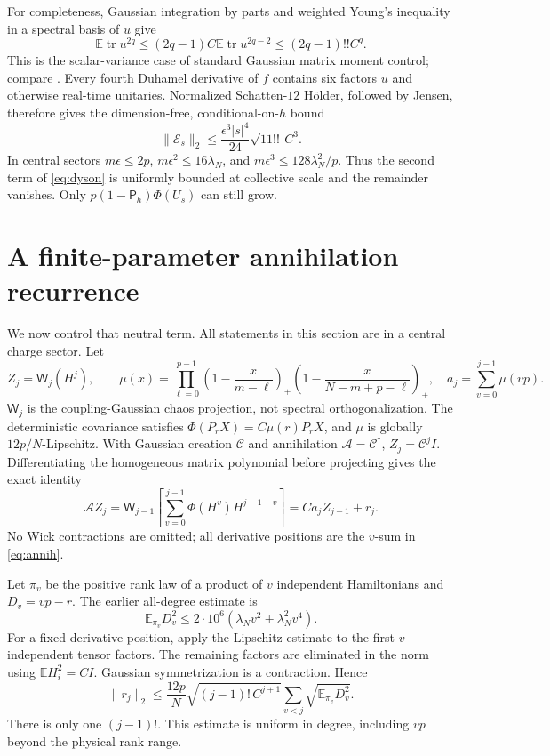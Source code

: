\documentclass[11pt,a4paper]{article}
\newcommand{\EE}{\mathbb E}
\newcommand{\tr}{\operatorname{tr}}
\newcommand{\PP}{\mathsf P_h}
\newcommand{\W}{\mathsf W}
\begin{document}
For completeness, Gaussian integration by parts and weighted Young's
inequality in a spectral basis of $u$ give
\begin{equation}
 \EE\tr u^{2q}\le(2q-1)C\EE\tr u^{2q-2}
 \le(2q-1)!!C^q.
\end{equation}
This is the scalar-variance case of standard Gaussian matrix moment
control; compare \cite{Tropp}. Every fourth Duhamel derivative of
$f$ contains six factors $u$ and otherwise real-time unitaries.
Normalized Schatten-$12$ H\"older, followed by Jensen, therefore gives
the dimension-free, conditional-on-$h$ bound
\begin{equation}
 \boxed{\quad
 \|\mathcal E_s\|_2\le
 \frac{\epsilon^3|s|^4}{24}\sqrt{11!!}\,C^3.\quad}
 \label{eq:dysonerror}
\end{equation}
In central sectors $m\epsilon\le2p$, $m\epsilon^2\le16\lambda_N$,
and $m\epsilon^3\le128\lambda_N^2/p$. Thus the second term of
\eqref{eq:dyson} is uniformly bounded at collective scale and the
remainder vanishes. Only $p(1-\PP)\Phi(U_s)$ can still grow.

\newpage
\section{A finite-parameter annihilation recurrence}
We now control that neutral term. All statements in this section
are in a central charge sector. Let
\begin{equation}
 Z_j=\W_j(H^j),\qquad
 \mu(x)=\prod_{\ell=0}^{p-1}
 \left(1-\frac{x}{m-\ell}\right)_+
 \left(1-\frac{x}{N-m+p-\ell}\right)_+,
 \quad a_j=\sum_{v=0}^{j-1}\mu(vp).
\end{equation}
$\W_j$ is the coupling-Gaussian chaos projection, not spectral
orthogonalization. The deterministic covariance satisfies
$\Phi(P_rX)=C\mu(r)P_rX$, and $\mu$ is globally
$12p/N$-Lipschitz. With Gaussian creation $\mathcal C$ and
annihilation $\mathcal A=\mathcal C^\dagger$, $Z_j=\mathcal C^jI$.
Differentiating the homogeneous matrix polynomial before projecting gives
the exact identity
\begin{equation}
 \mathcal A Z_j
 =\W_{j-1}\left[\sum_{v=0}^{j-1}\Phi(H^v)H^{j-1-v}\right]
 =Ca_jZ_{j-1}+r_j.
 \label{eq:annih}
\end{equation}
No Wick contractions are omitted; all derivative positions are the
$v$-sum in \eqref{eq:annih}.

Let $\pi_v$ be the positive rank law of a product of $v$ independent
Hamiltonians and $D_v=vp-r$. The earlier all-degree estimate is
\begin{equation}
 \EE_{\pi_v}D_v^2\le2\cdot10^6(\lambda_N v^2+\lambda_N^2v^4).
\end{equation}
For a fixed derivative position, apply the Lipschitz estimate to
the first $v$ independent tensor factors. The remaining factors
are eliminated in the norm using $\EE H_i^2=CI$. Gaussian
symmetrization is a contraction. Hence
\begin{equation}
 \boxed{\quad
 \|r_j\|_2\le\frac{12p}{N}\sqrt{(j-1)!\,C^{j+1}}
             \sum_{v<j}\sqrt{\EE_{\pi_v}D_v^2}.\quad}
 \label{eq:remainder}
\end{equation}
There is only one $(j-1)!$. This estimate is uniform in degree,
including $vp$ beyond the physical rank range.
\end{document}
